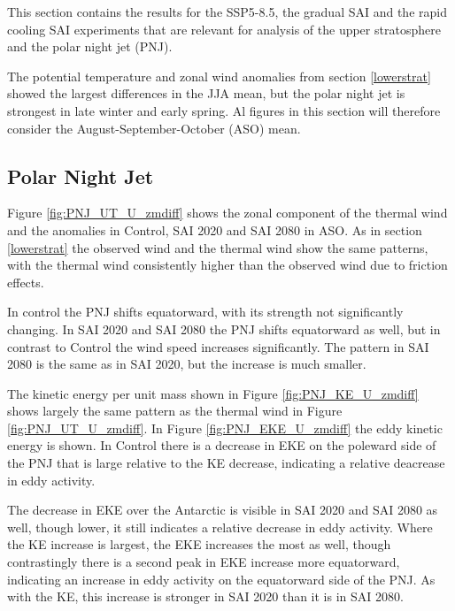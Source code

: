 This section contains the results for the SSP5-8.5, the gradual SAI and the rapid cooling SAI experiments that are relevant for analysis of the upper stratosphere and the polar night jet (PNJ).

The potential temperature and zonal wind anomalies from section \ref{lowerstrat} showed the largest differences in the JJA mean, but the polar night jet is strongest in late winter and early spring. Al figures in this section will therefore consider the August-September-October (ASO) mean. 

\subsection{Polar Night Jet}
Figure \ref{fig:PNJ_UT_U_zmdiff} shows the zonal component of the thermal wind and the anomalies in Control, SAI 2020 and SAI 2080 in ASO. As in section \ref{lowerstrat} the observed wind and the thermal wind show the same patterns, with the thermal wind consistently higher than the observed wind due to friction effects. 

In control the PNJ shifts equatorward, with its strength not significantly changing. In SAI 2020 and SAI 2080 the PNJ shifts equatorward as well, but in contrast to Control the wind speed increases significantly. The pattern in SAI 2080 is the same as in SAI 2020, but the increase is much smaller. 

The kinetic energy per unit mass shown in Figure \ref{fig:PNJ_KE_U_zmdiff} shows largely the same pattern as the thermal wind in Figure \ref{fig:PNJ_UT_U_zmdiff}. In Figure \ref{fig:PNJ_EKE_U_zmdiff} the eddy kinetic energy is shown. In Control there is a decrease in EKE on the poleward side of the PNJ that is large relative to the KE decrease, indicating a relative deacrease in eddy activity.

The decrease in EKE over the Antarctic is visible in SAI 2020 and SAI 2080 as well, though lower, it still indicates a relative decrease in eddy activity. Where the KE increase is largest, the EKE increases the most as well, though contrastingly there is a second peak in EKE increase more equatorward, indicating an increase in eddy activity on the equatorward side of the PNJ. As with the KE, this increase is stronger in SAI 2020 than it is in SAI 2080. 

